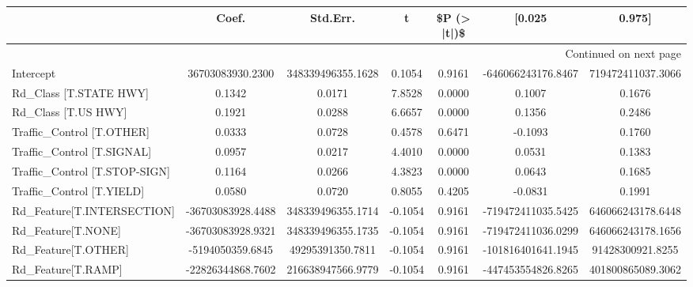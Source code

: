 \begin{longtable}{p{4cm}cccccc}
\toprule
{} &             Coef. &          Std.Err. &       t &  \$P (> |t|)\$ &             [0.025 &            0.975] \\
\midrule
\endhead
\midrule
\multicolumn{7}{r}{{Continued on next page}} \\
\midrule
\endfoot

\bottomrule
\endlastfoot
Intercept                                          &  36703083930.2300 & 348339496355.1628 &  0.1054 &       0.9161 & -646066243176.8467 & 719472411037.3066 \\
Rd\_Class [T.STATE HWY]                             &            0.1342 &            0.0171 &  7.8528 &       0.0000 &             0.1007 &            0.1676 \\
Rd\_Class [T.US HWY]                                &            0.1921 &            0.0288 &  6.6657 &       0.0000 &             0.1356 &            0.2486 \\
Traffic\_Control [T.OTHER]                          &            0.0333 &            0.0728 &  0.4578 &       0.6471 &            -0.1093 &            0.1760 \\
Traffic\_Control [T.SIGNAL]                         &            0.0957 &            0.0217 &  4.4010 &       0.0000 &             0.0531 &            0.1383 \\
Traffic\_Control [T.STOP-SIGN]                      &            0.1164 &            0.0266 &  4.3823 &       0.0000 &             0.0643 &            0.1685 \\
Traffic\_Control [T.YIELD]                          &            0.0580 &            0.0720 &  0.8055 &       0.4205 &            -0.0831 &            0.1991 \\
Rd\_Feature[T.INTERSECTION]                         & -36703083928.4488 & 348339496355.1714 & -0.1054 &       0.9161 & -719472411035.5425 & 646066243178.6448 \\
Rd\_Feature[T.NONE]                                 & -36703083928.9321 & 348339496355.1735 & -0.1054 &       0.9161 & -719472411036.0299 & 646066243178.1656 \\
Rd\_Feature[T.OTHER]                                &  -5194050359.6845 &  49295391350.7811 & -0.1054 &       0.9161 & -101816401641.1945 &  91428300921.8255 \\
Rd\_Feature[T.RAMP]                                 & -22826344868.7602 & 216638947566.9779 & -0.1054 &       0.9161 & -447453554826.8265 & 401800865089.3062 \\

\end{longtable}
